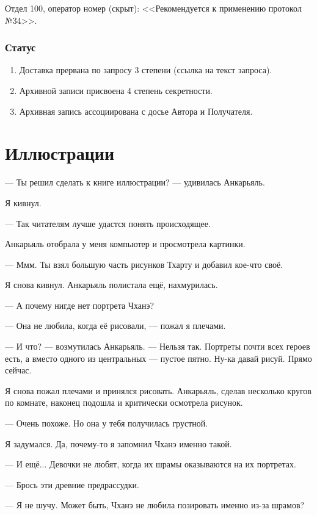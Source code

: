 \documentclass[a4paper,12pt,fleqn]{book}\usepackage{polyglossia}\setdefaultlanguage[babelshorthands=true]{russian}\setotherlanguage{english}\defaultfontfeatures{Ligatures=TeX,Mapping=tex-text}\usepackage{xcolor}\newcommand{\ml}[3]{#2}
\begin{document}
{Отдел 100, оператор номер (скрыт): <<Рекомендуется к применению протокол №34>>.

\subsubsection{Статус}

\begin{enumerate}
\item Доставка прервана по запросу 3 степени (ссылка на текст запроса).
\item Архивной записи присвоена 4 степень секретности.
\item Архивная запись ассоциирована с досье Автора и Получателя.
\end{enumerate}

\section{Иллюстрации}

--- Ты решил сделать к книге иллюстрации? --- удивилась Анкарьяль.

Я кивнул.

--- Так читателям лучше удастся понять происходящее.

Анкарьяль отобрала у меня компьютер и просмотрела картинки.

--- Ммм.
Ты взял большую часть рисунков Тхарту и добавил кое-что своё.

Я снова кивнул.
Анкарьяль полистала ещё, нахмурилась.

--- А почему нигде нет портрета Чханэ?

--- Она не любила, когда её рисовали, --- пожал я плечами.

--- И что? --- возмутилась Анкарьяль.
--- Нельзя так.
Портреты почти всех героев есть, а вместо одного из центральных --- пустое пятно.
Ну-ка давай рисуй.
Прямо сейчас.

Я снова пожал плечами и принялся рисовать.
Анкарьяль, сделав несколько кругов по комнате, наконец подошла и критически осмотрела рисунок.

--- Очень похоже.
Но она у тебя получилась грустной.

Я задумался.
Да, почему-то я запомнил Чханэ именно такой.

--- И ещё... Девочки не любят, когда их шрамы оказываются на их портретах.

--- Брось эти древние предрассудки.

--- Я не шучу.
Может быть, Чханэ не любила позировать именно из-за шрамов?

}
\end{document}
